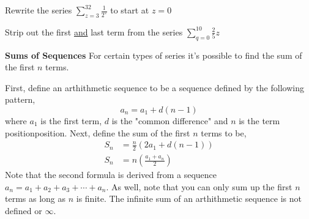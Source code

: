 \documentclass[addpoints]{exam}
\begin{document}
\begin{tcolorbox}[breakable, title=SERIES, colframe=black, sharp corners, colback=white, colbacktitle=white, coltitle=black]
          \vspace{0.1in}
          \noindent\makebox[\linewidth]{\hrulefill}
          \begin{questions}
            \begin{minipage}{0.45\linewidth}
              \question Rewrite the series $\sum\limits_{z=3}^{32} \frac{1}{2^z}$ to start at $z=0$
            \end{minipage}
            \hfill 
            \begin{minipage}{0.45\linewidth}
              \question Strip out the first \underline{and} last term from the series $\sum\limits_{q=0}^{10} \frac{2}{5}z$
              \end{minipage}
            \vspace{1.6in}
          \end{questions}
          \newpage 
          \large\textbf{Sums of Sequences}
          \newline\normalsize For certain types of series it's possible to find the sum of the first $n$ terms.
              \begin{tcolorbox}[breakable, title=SUM OF ARITHMETIC SEQUENCE, colframe=black, sharp corners, colback=white, colbacktitle=white, coltitle=black]
                First, define an arthithmetic sequence to be a sequence defined by the following pattern, 
                \[
                  a_n = a_1 + d(n-1)
                \]
                where $a_1$ is the first term, $d$ is the "common difference" and $n$ is the term positionposition. Next, define the sum of the first $n$ terms to be,
                \begin{align*}
                  S_n &= \frac{n}{2}\left(2a_1 + d(n-1)\right) \\ 
                S_n &= n\left(\frac{a_1 + a_n}{2}\right)                
                \end{align*}
                Note that the second formula is derived from a sequence $a_n = a_1 + a_2 + a_3 + \cdots + a_n$. As well, note that you can only sum up the first $n$ terms as long as $n$ is finite. The infinite sum of an arthithmetic sequence is not defined or $\infty$.
              \end{tcolorbox}


\end{tcolorbox}
\end{document}
